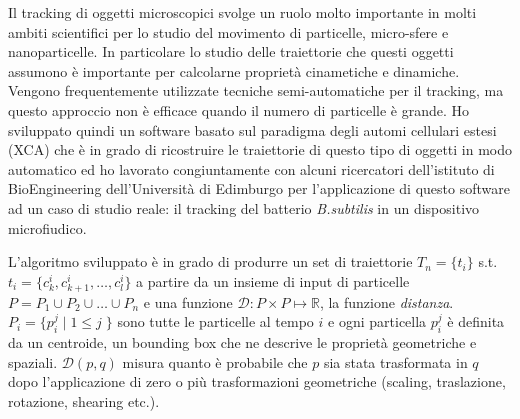 \documentclass[a4paper,11pt]{paper}
\begin{document}
\begin{figure}
\caption{}\label{match}
\end{figure}
Il tracking di oggetti microscopici svolge un ruolo molto importante in molti ambiti scientifici per lo studio del movimento di particelle,  micro-sfere   e nanoparticelle. In particolare lo studio delle traiettorie che questi oggetti assumono è importante per calcolarne proprietà cinametiche e dinamiche. Vengono frequentemente utilizzate tecniche semi-automatiche per il tracking, ma questo approccio non è efficace quando il numero di particelle è grande.
Ho sviluppato quindi un software basato sul paradigma degli automi cellulari estesi (XCA) che è in grado di ricostruire le traiettorie di questo tipo di oggetti in modo automatico ed ho lavorato congiuntamente con alcuni ricercatori dell'istituto di BioEngineering dell'Università di Edimburgo per l'applicazione di questo software ad un caso di studio reale: il tracking del batterio \textit{B.subtilis} in un dispositivo microfiudico.

L'algoritmo sviluppato è in grado di produrre un set di traiettorie $ T_n = \{ t_i \}$  s.t.  $t_i=\{ c^i_k,c^i_{k+1},\ldots,c^i_l \} $ a partire da un insieme di input di particelle $P=P_1 \cup P_2 \cup \ldots \cup P_n$ e una funzione $\mathcal{D} :  P \times P \mapsto \mathbb{R}$, 
la funzione  \textit{distanza}.
 $P_i = \{p^j_i \; | \; 1 \leq j\; \}$ sono tutte le particelle al tempo $i$ e ogni particella $p_i^j$ è definita da un centroide, un bounding box che ne descrive le proprietà geometriche e spaziali. 
$\mathcal{D}(p,q)$ misura quanto è probabile che  $p$ sia stata trasformata in $q$ dopo l'applicazione di zero o più trasformazioni geometriche (scaling, traslazione, rotazione, shearing etc.). 
\end{document}
